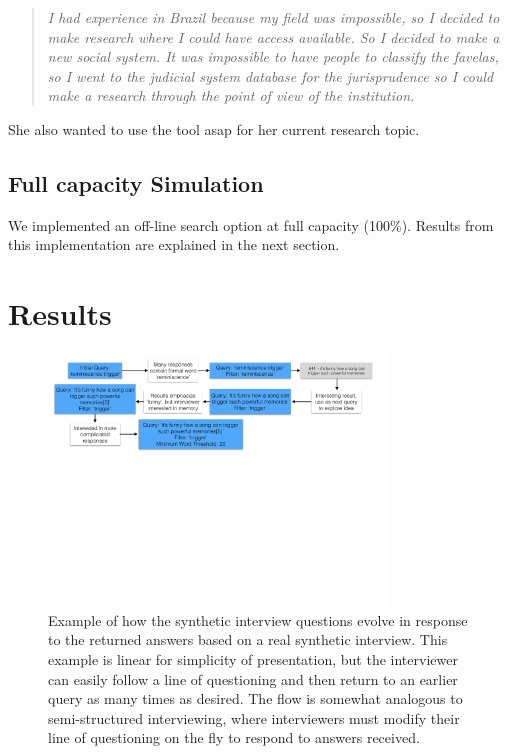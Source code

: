 \documentclass{sigchi}
\begin{document}
\begin{quote}
{\em
I had experience in Brazil because my field was impossible, so I decided to make research where I could have access available. So I decided to make a new social system. It was impossible to have people to classify the favelas, so I went to the judicial system database for the jurisprudence so I could make a research through the point of view of the institution.
}\end{quote}

She also wanted to use the tool asap for her current research topic.

\subsection{Full capacity Simulation}
We implemented an off-line search option at full capacity (100\%). Results from this implementation are explained in the next section.



\section{Results}

\begin{figure}[htb]
\centering \includegraphics[width=0.8\textwidth]{figures/InterviewFlow.pdf} 
\caption{Example of how the synthetic interview questions evolve in response to the returned answers based on a real synthetic interview. This example is linear for simplicity of presentation, but the interviewer can easily follow a line of questioning and then return to an earlier query as many times as desired. The flow is somewhat analogous to semi-structured interviewing, where interviewers must modify their line of questioning on the fly to respond to answers received.}
\end{figure}
\end{document}
